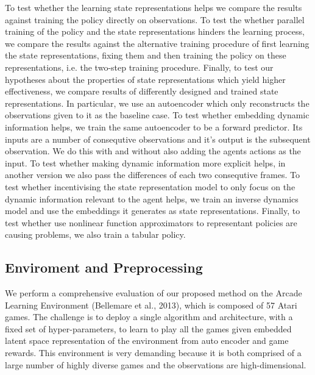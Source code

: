 To test whether the learning state representations helps we compare the results
against training the policy directly on observations.
To test the whether parallel training of the policy and the state representations
hinders the learning process, we compare the results against the alternative training procedure
of first learning the state representations,
fixing them and then training the policy on these representations, i.e. the two-step training procedure.
Finally, to test our hypotheses about the properties of state representations which yield
higher effectiveness, we compare results of differently designed and trained state representations.
In particular, we use an autoencoder which only reconstructs the observations given to it
as the baseline case.
To test whether embedding dynamic information helps, we train the same autoencoder to
be a forward predictor. Its inputs are a number of consequtive observations and it's output 
is the subsequent observation.
We do this with and without also adding the agents actions as the input.
To test whether making dynamic information more explicit helps,
in another version we also pass the differences of each two consequtive frames.
To test whether incentivising the state representation model to only focus on the
dynamic information relevant to the agent helps, we train an inverse dynamics model and
use the embeddings it generates as state representations.
Finally, to test whether use nonlinear function approximators
to representant policies are causing problems, we also train a tabular policy.




\subsection{Enviroment and Preprocessing}

We perform a comprehensive evaluation of our 
proposed method on the Arcade Learning Environment (Bellemare et al., 2013), 
which is composed of 57 Atari games. 
The challenge is to deploy a single algorithm and architecture, 
with a fixed set of hyper-parameters, 
to learn to play all the games given embedded latent space 
representation of the environment from auto encoder and game rewards. 
This environment is very demanding because it is both 
comprised of a large number of highly diverse games and the observations are high-dimensional.

